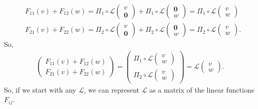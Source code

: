 \documentclass{article}
\theoremstyle{definition}
\newcommand{\F}{\mathcal{F}}
\newcommand{\lag}{\mathcal{L}}
\begin{document}
\begin{align}
&F_{11}(v) + F_{12}(w) = \Pi_1 \circ \lag\begin{pmatrix}
v \\ \mathbf{0}
\end{pmatrix}
+
\Pi_1 \circ \lag \begin{pmatrix}
\mathbf{0} \\ w
\end{pmatrix}
=
\Pi_1 \circ \lag\begin{pmatrix}
v\\w
\end{pmatrix}\\
&F_{21}(v) + F_{22}(w) = \Pi_2 \circ \lag\begin{pmatrix}
v \\ \mathbf{0}
\end{pmatrix}
+
\Pi_2 \circ \lag \begin{pmatrix}
\mathbf{0} \\ w
\end{pmatrix}
=
\Pi_2 \circ \lag\begin{pmatrix}
v\\w
\end{pmatrix}.
\end{align}
So,
\begin{align*}
\begin{pmatrix}
F_{11}(v) + F_{12}(w)\\F_{21}(v) + F_{22}(w)
\end{pmatrix}
= \begin{pmatrix}
\Pi_1 \circ \lag\begin{pmatrix}
v\\w
\end{pmatrix}\\
\Pi_2 \circ \lag\begin{pmatrix}
v\\w
\end{pmatrix}
\end{pmatrix}
=
\lag\begin{pmatrix}
v\\w
\end{pmatrix}.
\end{align*}
So, if we start with any $\lag$, we can represent $\lag$ as a matrix of the linear functions $F_{ij}$.
\end{document}
